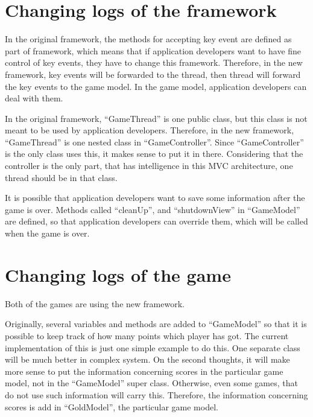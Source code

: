 \documentclass{report}
\begin{document}
\section{Changing logs of the framework}
In the original framework, the methods for accepting key event are defined as part of framework, which means that if application developers want to 
have fine control of key events, they have to change this framework. Therefore, in the new framework, key events will be forwarded to the thread, 
then thread will forward the key events to the game model. In the game model, application developers can deal with them.

In the original framework, ``GameThread'' is one public class, but this class is not meant to be used by application developers. Therefore, in the 
new framework, ``GameThread'' is one nested class in ``GameController''. Since ``GameController'' is the only class uses this, it makes sense to put 
it in there. Considering that the controller is the only part, that has intelligence in this MVC architecture, one thread should be in that class.

It is possible that application developers want to save some information after the game is over. Methods called ``cleanUp'', and ``shutdownView'' in 
``GameModel'' are defined, so that application developers can override them, which will be called when the game is over.
\section{Changing logs of the game}
Both of the games are using the new framework.

Originally, several variables and methods are added to ``GameModel'' so that it is possible to keep track of how many points which player has got. 
The current implementation of this is just one simple example to do this. One separate class will be much better in complex system. On the second 
thoughts, it will make more sense to put the information concerning scores in the particular game model, not in the ``GameModel'' super class. 
Otherwise, even some games, that do not use such information will carry this. Therefore, the information concerning scores is add in ``GoldModel'', 
the particular game model.
\end{document}
